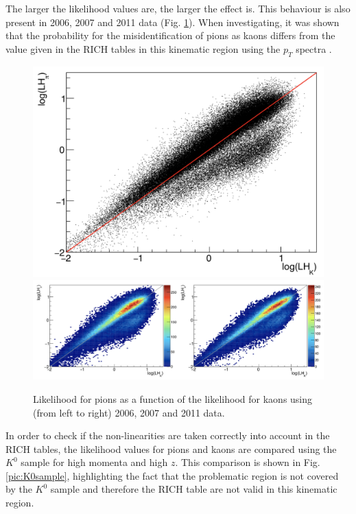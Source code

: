 The larger the likelihood values are, the larger the effect is. This behaviour is also present in 2006, 2007 and 2011 data (Fig. \ref{pic:NonLinother}). When investigating, it was shown that the probability for the misidentification of pions as kaons differs from the value given in the RICH tables in this kinematic region using the $p_T$ spectra \cite{MarcinNote}.

\begin{figure}[!h]
  \centering
	\includegraphics[scale=0.2]{./gfx/RICHLH2006.png}
  \includegraphics[scale=0.3]{./gfx/RICHLH2011.png}
	\caption{Likelihood for pions as a function of the likelihood for kaons using (from left to right) 2006, 2007 and 2011 data.}
	\label{pic:NonLinother}
\end{figure}

In order to check if the non-linearities are taken correctly into account in the RICH tables, the likelihood values for pions and kaons are compared using the $K^0$ sample for high momenta and high $z$. This comparison is shown in Fig. \ref{pic:K0sample}, highlighting the fact that the problematic region is not covered by the $K^0$ sample and therefore the RICH table are not valid in this kinematic region.

